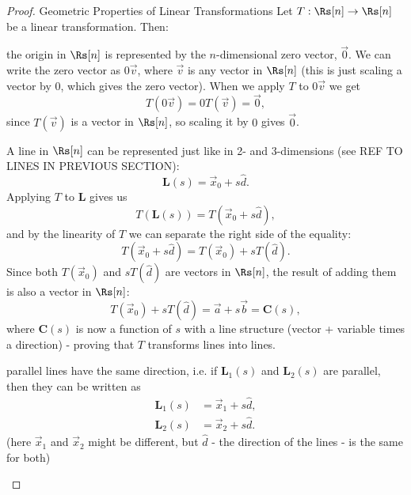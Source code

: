 \begin{proof}{Geometric Properties of Linear Transformations}{}
	Let $T:\Rs[n]\to\Rs[n]$ be a linear transformation. Then:
	\begin{descitemize}
		\item[The origin is kept untouched] the origin in $\Rs[n]$ is represented by the $n$-dimensional zero vector, $\vec{0}$. We can write the zero vector as $0\vec{v}$, where $\vec{v}$ is any vector in $\Rs[n]$ (this is just scaling a vector by $0$, which gives the zero vector). When we apply $T$ to $0\vec{v}$ we get
		\begin{equation*}
			T(0\vec{v}) = 0T(\vec{v}) = \vec{0},
		\end{equation*}
		since $T(\vec{v})$ is a vector in $\Rs[n]$, so scaling it by $0$ gives $\vec{0}$.

		\item[Lines remain lines] A line in $\Rs[n]$ can be represented just like in 2- and 3-dimensions (see REF TO LINES IN PREVIOUS SECTION):
		\begin{equation*}
			\mathbf{L}(s) = \vec{x}_{0} + s\hat{d}.
		\end{equation*}
		Applying $T$ to $\mathbf{L}$ gives us
		\begin{equation*}
			T\left(\mathbf{L}(s)\right) = T\left(\vec{x}_{0} + s\hat{d}\right),
		\end{equation*}
		and by the linearity of $T$ we can separate the right side of the equality:
		\begin{equation*}
			T\left(\vec{x}_{0} + s\hat{d}\right) = T(\vec{x}_{0}) + sT(\hat{d}).
		\end{equation*}
		Since both $T(\vec{x}_{0})$ and $sT(\hat{d})$ are vectors in $\Rs[n]$, the result of adding them is also a vector in $\Rs[n]$:
		\begin{equation*}
			T(\vec{x}_{0}) + sT(\hat{d}) = \vec{a}+s\vec{b} = \mathbf{C}(s),
		\end{equation*}
		where $\mathbf{C}(s)$ is now a function of $s$ with a line structure (vector + variable times a direction) - proving that $T$ transforms lines into lines.

		\item[Parallel directions remain parallel] parallel lines have the same direction, i.e. if $\mathbf{L}_{1}(s)$ and $\mathbf{L}_{2}(s)$ are parallel, then they can be written as
		\begin{align*}
			\mathbf{L}_{1}(s) & = \vec{x}_{1} + s\hat{d}, \\
			\mathbf{L}_{2}(s) & = \vec{x}_{2} + s\hat{d}.
		\end{align*}
		(here $\vec{x}_{1}$ and $\vec{x}_{2}$ might be different, but $\hat{d}$ - the direction of the lines - is the same for both)


\end{descitemize}
\end{proof}
